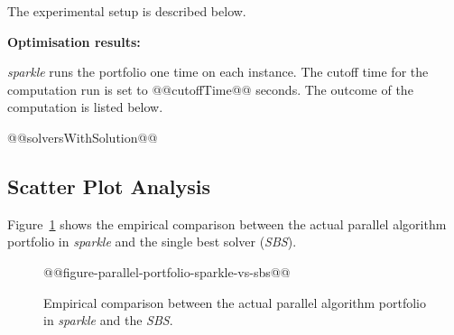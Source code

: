\documentclass[british]{article}
\newif\ifdecision
\begin{document}
The experimental setup is described below.

\ifdecision \textbf{Performance computation:}
\else \textbf{Optimisation results:}
\fi
\emph{sparkle} runs the portfolio one time on each instance. The cutoff time for the computation run is set to @@cutoffTime@@ seconds. The outcome of the computation is listed below.
\ifdecision
The scores of the outcomes are calculated according to @@performanceMetric@@, this means that for each instance the solver which solved the instance is scored its runtime and the remaining solvers are scored the runtime times ten. If however the portfolio reaches the cutofftime, which means that no solvers solved the instance, all solvers are scored the cutofftime times ten.
\fi

\begin{enumerate}
@@solversWithSolution@@
\end{enumerate}
\ifdecision
In the table below the computed @@performanceMetric@@ scores of all solvers have been listed aswell as for the parallel algorithm portfolio itself.
\begin{table}[ht]
@@resultsTable@@
\end{table}
\fi
\subsection{Scatter Plot Analysis}
\label{sec:Scatter_Plot_Analysis}

Figure~\ref{fig:sparkle_vs_sbs} shows the empirical comparison between the actual parallel algorithm portfolio in \emph{sparkle} and the single best solver (\emph{SBS}).

\begin{figure}[htbp]
\noindent \begin{centering}
    @@figure-parallel-portfolio-sparkle-vs-sbs@@
\par\end{centering}

\caption{Empirical comparison between the actual parallel algorithm portfolio in \emph{sparkle} and the \emph{SBS}.}\label{fig:sparkle_vs_sbs}
\end{figure}



\end{document}
